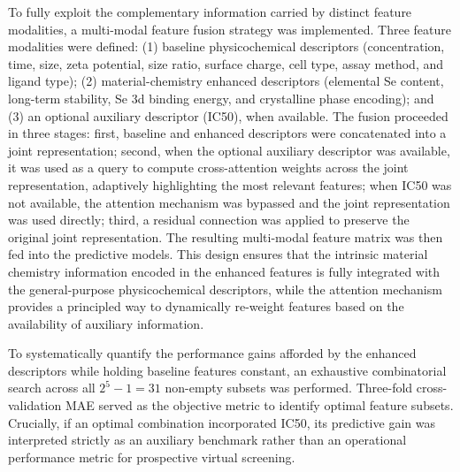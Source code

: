 \documentclass[letterpaper]{article}
\begin{document}
To fully exploit the complementary information carried by distinct feature modalities, a multi-modal feature fusion strategy was implemented. Three feature modalities were defined: (1) baseline physicochemical descriptors (concentration, time, size, zeta potential, size ratio, surface charge, cell type, assay method, and ligand type); (2) material-chemistry enhanced descriptors (elemental Se content, long-term stability, Se 3d binding energy, and crystalline phase encoding); and (3) an optional auxiliary descriptor (IC50), when available. The fusion proceeded in three stages: first, baseline and enhanced descriptors were concatenated into a joint representation; second, when the optional auxiliary descriptor was available, it was used as a query to compute cross-attention weights across the joint representation, adaptively highlighting the most relevant features; when IC50 was not available, the attention mechanism was bypassed and the joint representation was used directly; third, a residual connection was applied to preserve the original joint representation. The resulting multi-modal feature matrix was then fed into the predictive models. This design ensures that the intrinsic material chemistry information encoded in the enhanced features is fully integrated with the general-purpose physicochemical descriptors, while the attention mechanism provides a principled way to dynamically re-weight features based on the availability of auxiliary information.

To systematically quantify the performance gains afforded by the enhanced descriptors while holding baseline features constant, an exhaustive combinatorial search across all $2^5 - 1 = 31$ non-empty subsets was performed. Three-fold cross-validation MAE served as the objective metric to identify optimal feature subsets. Crucially, if an optimal combination incorporated IC50, its predictive gain was interpreted strictly as an auxiliary benchmark rather than an operational performance metric for prospective virtual screening.
\end{document}
